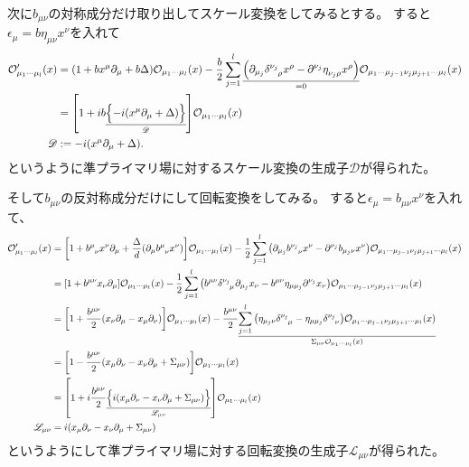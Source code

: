 \documentclass[../../master.tex]{subfiles}
\begin{document}
次に\(b_{\mu\nu}\)の対称成分だけ取り出してスケール変換をしてみるとする。
すると\(\epsilon_\mu = b \eta_{\mu\nu}x^\nu\)を入れて
\begin{align}
    \mathcal{O}'_{\mu_1\cdots\mu_l}(x)
    &= (1 + bx^\mu \partial_\mu + b \Delta)\mathcal{O}_{\mu_1\cdots\mu_l}(x)
        -\frac{b}{2}\sum_{j=1}^l \underlineset{=0}{\qty(\partial_{\mu_j} \tensor{\delta}{^{\nu_j}_\rho}x^\rho-\partial^{\nu_j} \tensor{\eta}{_{\nu_j}_\rho}x^\rho)}\mathcal{O}_{\mu_1\cdots\mu_{j-1}\nu_j\mu_{j+1}\cdots\mu_l}(x)\notag\\
    &= \qty[1 +ib\underlineset{\mathscr{D}}{\Bigl\{-i(x^\mu\partial_\mu +\Delta)\Bigr\}}]\mathcal{O}_{\mu_1\cdots\mu_l}(x) \notag\\
    \mathscr{D} &:= -i(x^\mu\partial_\mu +\Delta).
\end{align}
というように準プライマリ場に対するスケール変換の生成子\(\mathscr{D}\)が得られた。

そして\(b_{\mu\nu}\)の反対称成分だけにして回転変換をしてみる。
すると\(\epsilon_\mu = b_{\mu\nu}x^\nu\)を入れて、
\begin{align}
    \mathcal{O}'_{\mu_1\cdots\mu_l}(x)
    &=\qty[1+b\indices{^\mu_\nu}x^\nu\partial_\mu +\frac{\Delta}{d}(\partial_\mu b\indices{^\mu_\nu}x^\nu)]\mathcal{O}_{\mu_1\cdots\mu_l}(x)
        -\frac{1}{2}\sum_{j=1}^l \qty(\partial_{\mu_j} \tensor{b}{^{\nu_j}_\nu}x^\nu-\partial^{\nu_j} b_{{\mu_j}\nu}x^\nu)\mathcal{O}_{\mu_1\cdots\mu_{j-1}\nu_j\mu_{j+1}\cdots\mu_l}(x)\notag\\
    &=\qty[1+b^{\mu\nu}x_\nu\partial_\mu]\mathcal{O}_{\mu_1\cdots\mu_l}(x)
        -\frac{1}{2}\sum_{j=1}^l \qty(\tensor{b}{^\mu^\nu}\tensor{\delta}{^{\nu_j}_\mu}\partial_{\mu_j} x_\nu-b\indices{^\mu^\nu}\eta_{\mu \mu_j}\partial^{\nu_j} x_\nu)\mathcal{O}_{\mu_1\cdots\mu_{j-1}\nu_j\mu_{j+1}\cdots\mu_l}(x)\notag\\
    &=\qty[1+\frac{b^{\mu\nu}}{2}(x_\nu\partial_\mu-x_\mu\partial_\nu)]\mathcal{O}_{\mu_1\cdots\mu_l}(x)
        -\frac{b^{\mu\nu}}{2}\underlineset{\Sigma_{\mu\nu}\mathcal{O}_{\mu_1\cdots\mu_l}(x)}{\sum_{j=1}^l \qty(\eta_{{\mu_j}\nu}\tensor{\delta}{^{\nu_j}_\mu}-\eta_{\mu \mu_j}\tensor{\delta}{^{\nu_j}_\nu})\mathcal{O}_{\mu_1\cdots\mu_{j-1}\nu_j\mu_{j+1}\cdots\mu_l}(x)}\notag\\
    &=\qty[1-\frac{b^{\mu\nu}}{2}\qty(x_\mu\partial_\nu -x_\nu\partial_\mu+\Sigma_{\mu\nu})]\mathcal{O}_{\mu_1\cdots\mu_l}(x)\notag\\
    &=\qty[1+i\frac{b^{\mu\nu}}{2}\underlineset{\mathscr{L}_{\mu\nu}}{\Bigl\{i(x_\mu\partial_\nu-x_\nu\partial_\mu + \Sigma_{\mu\nu})\Bigr\}}]\mathcal{O}_{\mu_1\cdots\mu_l}(x)\notag\\
    \mathscr{L}_{\mu\nu}&=i(x_\mu\partial_\nu-x_\nu\partial_\mu + \Sigma_{\mu\nu})
\end{align}
というようにして準プライマリ場に対する回転変換の生成子\(\mathscr{L}_{\mu\nu}\)が得られた。
\end{document}
